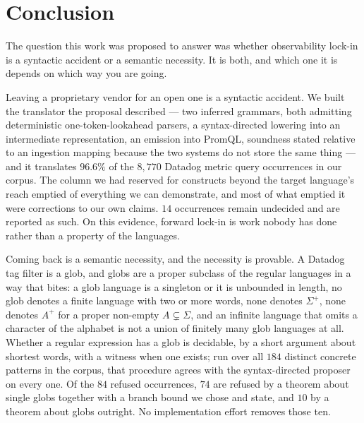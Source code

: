 
\section{Conclusion}
\label{s:sec:conclusion}

The question this work was proposed to answer was whether observability lock-in is a
syntactic accident or a semantic necessity. It is both, and which one it is depends on
which way you are going.

Leaving a proprietary vendor for an open one is a syntactic accident. We built the
translator the proposal described --- two inferred grammars, both admitting deterministic
one-token-lookahead parsers, a syntax-directed lowering into an intermediate
representation, an emission into PromQL, soundness stated relative to an ingestion mapping
because the two systems do not store the same thing --- and it translates $96.6\%$ of the
$8{,}770$ Datadog metric query occurrences in our corpus. The column we had reserved for
constructs beyond the target language's reach emptied of everything we can demonstrate,
and most of what emptied it were corrections to our own claims. $14$ occurrences remain
undecided and are reported as such. On this evidence, forward lock-in is work nobody has
done rather than a property of the languages.

Coming back is a semantic necessity, and the necessity is provable. A Datadog tag filter
is a glob, and globs are a proper subclass of the regular languages in a way that bites:
a glob language is a singleton or it is unbounded in length, no glob denotes a finite
language with two or more words, none denotes $\Sigma^{+}$, none denotes $A^{+}$ for a
proper non-empty $A\subsetneq\Sigma$, and an infinite language that omits a character of
the alphabet is not a union of finitely many glob languages at all. Whether a regular
expression has a glob is decidable, by a short argument about shortest words, with a
witness when one exists; run over all $184$ distinct concrete patterns in the corpus, that
procedure agrees with the syntax-directed proposer on every one. Of the $84$ refused
occurrences, $74$ are refused by a theorem about single globs together with a branch bound
we chose and state, and $10$ by a theorem about globs outright. No implementation effort
removes those ten.

